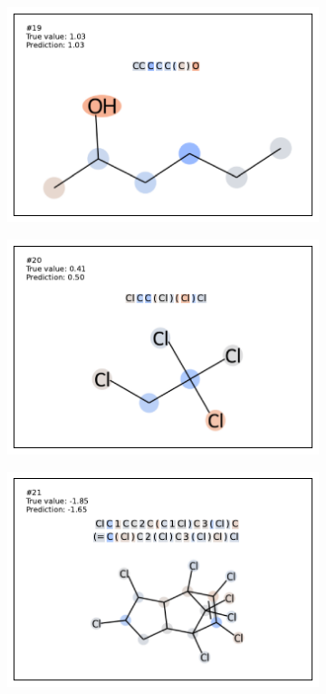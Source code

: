 \begin{figure}
\begin{subfigure}[b]{0.33\textwidth}
\end{subfigure}
\begin{subfigure}[b]{0.33\textwidth} 
  \centering 
  \includegraphics[width=\textwidth]{figures/esol/esol19.pdf} 
\end{subfigure}\begin{subfigure}[b]{0.33\textwidth} 
  \centering 
  \includegraphics[width=\textwidth]{figures/esol/esol20.pdf} 
\end{subfigure}\begin{subfigure}[b]{0.33\textwidth} 
  \centering 
  \includegraphics[width=\textwidth]{figures/esol/esol21.pdf} 
\end{subfigure}



\end{figure}
